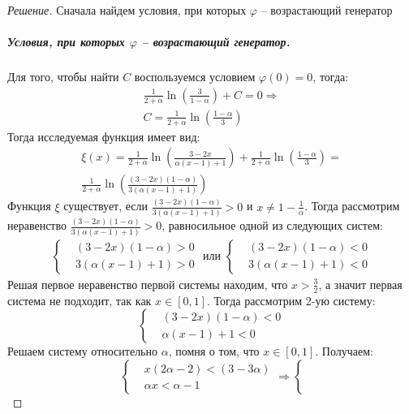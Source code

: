 \documentclass[11pt,a4paper,oneside]{article}
\newenvironment{solution}{
	\begin{proof}[Решение]
		\vspace{-8px}
		\setlength{\parskip}{4px}
		\setlength{\parindent}{0px}
	}{
	\end{proof}
}
\begin{document}
	\begin{solution}
		Сначала найдем условия, при которых $\varphi$ -- возрастающий генератор
		\subparagraph{Условия, при которых $\varphi$ -- возрастающий генератор.}
		Для того, чтобы найти $C$ воспользуемся условием $ \varphi(0) = 0$, тогда:
		\begin{gather*}
			\frac{1}{2+\alpha}\ln \left( \frac{3}{1-\alpha} \right) + C = 0 \Rightarrow \\
			C = \frac{1}{2+\alpha}\ln \left( \frac{1-\alpha}{3} \right)
		\end{gather*}
		Тогда исследуемая функция имеет вид:
		\begin{gather*}
			\xi(x) = \frac{1}{2+\alpha}\ln \left( \frac{3-2x}{\alpha(x-1) + 1} \right) + \frac{1}{2+\alpha}\ln \left( \frac{1-\alpha}{3} \right) = \\
			 \frac{1}{2+\alpha}  \ln\left( \frac{(3-2x)(1-\alpha)}{3(\alpha(x-1) + 1)} \right)
		\end{gather*}
		Функция $\xi$ существует, если $ \frac{(3-2x)(1-\alpha)}{3(\alpha(x-1) + 1)} > 0 $ и $ x \neq 1 - \frac{1}{\alpha} $. Тогда рассмотрим неравенство $ \frac{(3-2x)(1-\alpha)}{3(\alpha(x-1) + 1)} > 0$, равносильное одной из следующих систем:
		\begin{gather*}
			\left\{
				\begin{aligned}
				&(3-2x)(1-\alpha) > 0 \\
				& 3(\alpha(x-1) + 1) > 0
				\end{aligned}
			\right.
			\text{  или  }
			\left\{
			\begin{aligned}
			&(3-2x)(1-\alpha) < 0 \\
			& 3(\alpha(x-1) + 1) < 0
			\end{aligned}
			\right.
		\end{gather*}
		Решая первое неравенство первой системы находим, что $ x > \frac{3}{2}$, а значит первая система не подходит, так как $ x \in [0,1]$. Тогда рассмотрим 2-ую систему:
		\[
			\left\{
			\begin{aligned}
			&(3-2x)(1-\alpha) < 0 \\
			&\alpha(x-1) + 1 < 0
			\end{aligned}
			\right.
		\]
		Решаем систему относительно $\alpha$, помня о том, что $ x \in [0,1]$. Получаем:
		\[
		\left\{
		\begin{aligned}
		&x(2\alpha - 2) < (3 - 3\alpha) \\
		&\alpha x < \alpha-1
		\end{aligned}
		\right.
		\Rightarrow 
		\left\{
\]
\end{solution}
\end{document}
